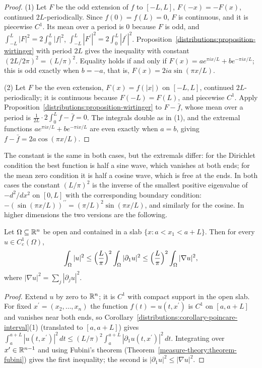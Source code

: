 \begin{proof}
(1) Let $F$ be the odd extension of $f$ to $[-L, L]$, $F(-x) = -F(x)$, continued $2L$-periodically. Since $f(0) = f(L) = 0$, $F$ is continuous, and it is piecewise $C^1$. Its mean over a
period is $0$ because $F$ is odd, and $\int_{-L}^L|F|^2 = 2\int_0^L|f|^2$, $\int_{-L}^L|F^{\prime}|^2 = 2\int_0^L|f^{\prime}|^2$. Proposition~\ref{distributions:proposition-wirtinger} with period $2L$ gives
the inequality with constant $(2L/2\pi)^2 = (L/\pi)^2$. Equality holds if and only if $F(x) = ae^{\pi ix/L} + be^{-\pi ix/L}$; this is odd exactly when $b = -a$, that is, $F(x) = 2ia\sin(\pi x/L)$.

(2) Let $F$ be the even extension, $F(x) = f(|x|)$ on $[-L, L]$, continued $2L$-periodically; it is continuous because $F(-L) = F(L)$, and piecewise $C^1$. Apply
Proposition~\ref{distributions:proposition-wirtinger} to $F - \bar f$, whose mean over a period is $\frac{1}{2L}\cdot 2\int_0^Lf - \bar f = 0$. The integrals double as in (1), and the extremal functions
$ae^{\pi ix/L} + be^{-\pi ix/L}$ are even exactly when $a = b$, giving $f - \bar f = 2a\cos(\pi x/L)$.
\end{proof}

The constant is the same in both cases, but the extremals differ: for the Dirichlet condition the best function is half a sine wave, which vanishes at both ends; for the mean zero condition it
is half a cosine wave, which is free at the ends. In both cases the constant $(L/\pi)^2$ is the inverse of the smallest positive eigenvalue of $-d^2/dx^2$ on $[0, L]$ with the corresponding
boundary condition: $-(\sin(\pi x/L))^{\prime\prime} = (\pi/L)^2\sin(\pi x/L)$, and similarly for the cosine. In higher dimensions the two versions are the following.

\begin{theorem}\label{distributions:theorem-poincare-dirichlet}
Let $\Omega \subseteq \mathbb{R}^n$ be open and contained in a slab $\{x : a < x_1 < a + L\}$. Then for every $u \in C^1_c(\Omega)$,
\[
\int_\Omega|u|^2 \leq \Bigl(\frac{L}{\pi}\Bigr)^2\int_\Omega|\partial_1u|^2 \leq \Bigl(\frac{L}{\pi}\Bigr)^2\int_\Omega|\nabla u|^2,
\]
where $|\nabla u|^2 = \sum_j|\partial_ju|^2$.
\end{theorem}

\begin{proof}
Extend $u$ by zero to $\mathbb{R}^n$; it is $C^1$ with compact support in the open slab. For fixed $x^{\prime} = (x_2, \ldots, x_n)$ the function $f(t) = u(t, x^{\prime})$ is $C^1$ on $[a, a + L]$ and vanishes
near both ends, so Corollary~\ref{distributions:corollary-poincare-interval}(1) (translated to $[a, a + L]$) gives $\int_a^{a+L}|u(t, x^{\prime})|^2\,dt \leq (L/\pi)^2\int_a^{a+L}|\partial_1u(t, x^{\prime})|^2\,dt$.
Integrating over $x^{\prime} \in \mathbb{R}^{n-1}$ and using Fubini's theorem (Theorem~\ref{measure-theory:theorem-fubini}) gives the first inequality; the second is $|\partial_1u|^2 \leq |\nabla u|^2$.
\end{proof}

